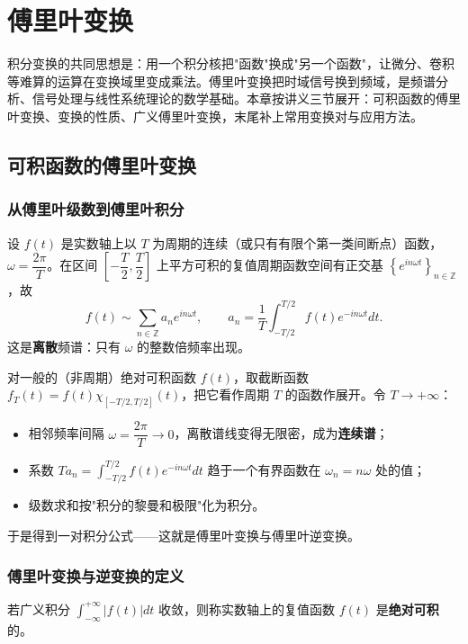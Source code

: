 \chapter{傅里叶变换}

积分变换的共同思想是：用一个积分核把"函数"换成"另一个函数"，让微分、卷积等难算的运算在变换域里变成乘法。傅里叶变换把时域信号换到频域，是频谱分析、信号处理与线性系统理论的数学基础。本章按讲义三节展开：可积函数的傅里叶变换、变换的性质、广义傅里叶变换，末尾补上常用变换对与应用方法。

\section{可积函数的傅里叶变换}

\subsection{从傅里叶级数到傅里叶积分}

设 \(f(t)\) 是实数轴上以 \(T\) 为周期的连续（或只有有限个第一类间断点）函数，\(\omega=\dfrac{2\pi}{T}\)。在区间 \(\left[-\dfrac{T}{2},\dfrac{T}{2}\right]\) 上平方可积的复值周期函数空间有正交基 \(\left\{e^{in\omega t}\right\}_{n\in\mathbb{Z}}\)，故
\[
f(t)\sim\sum_{n\in\mathbb{Z}}a_ne^{in\omega t},\qquad
a_n=\frac{1}{T}\int_{-T/2}^{T/2}f(t)e^{-in\omega t}dt .
\]
这是\textbf{离散}频谱：只有 \(\omega\) 的整数倍频率出现。

对一般的（非周期）绝对可积函数 \(f(t)\)，取截断函数 \(f_T(t)=f(t)\chi_{[-T/2,T/2]}(t)\)，把它看作周期 \(T\) 的函数作展开。令 \(T\to+\infty\)：
\begin{itemize}
    \item 相邻频率间隔 \(\omega=\dfrac{2\pi}{T}\to0\)，离散谱线变得无限密，成为\textbf{连续谱}；
    \item 系数 \(T a_n=\displaystyle\int_{-T/2}^{T/2}f(t)e^{-in\omega t}dt\) 趋于一个有界函数在 \(\omega_n=n\omega\) 处的值；
    \item 级数求和按"积分的黎曼和极限"化为积分。
\end{itemize}
于是得到一对积分公式——这就是傅里叶变换与傅里叶逆变换。

\subsection{傅里叶变换与逆变换的定义}

若广义积分 \(\displaystyle\int_{-\infty}^{+\infty}|f(t)|dt\) 收敛，则称实数轴上的复值函数 \(f(t)\) 是\textbf{绝对可积}的。

